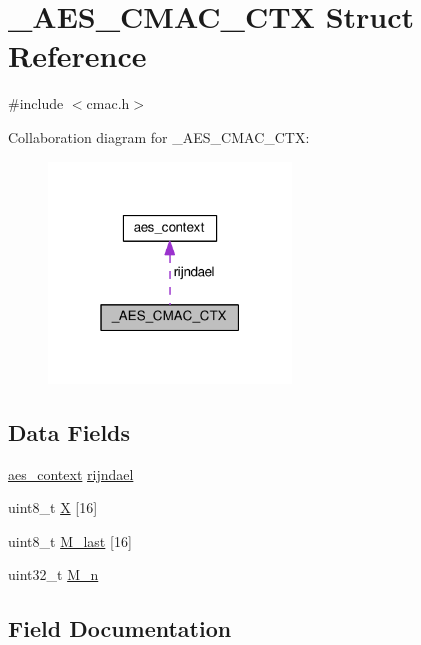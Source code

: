 \hypertarget{struct__AES__CMAC__CTX}{}\section{\+\_\+\+A\+E\+S\+\_\+\+C\+M\+A\+C\+\_\+\+C\+TX Struct Reference}
\label{struct__AES__CMAC__CTX}


{\ttfamily \#include $<$cmac.\+h$>$}



Collaboration diagram for \+\_\+\+A\+E\+S\+\_\+\+C\+M\+A\+C\+\_\+\+C\+TX\+:
\nopagebreak
\begin{figure}[H]
\begin{center}
\leavevmode
\includegraphics[width=183pt]{struct__AES__CMAC__CTX__coll__graph}
\end{center}
\end{figure}
\subsection*{Data Fields}
\begin{DoxyCompactItemize}
\item 
\hyperlink{structaes__context}{aes\+\_\+context} \hyperlink{struct__AES__CMAC__CTX_a111583eab419917697a4ed96963f293c}{rijndael}
\item 
uint8\+\_\+t \hyperlink{struct__AES__CMAC__CTX_a3be115a420dc4da7db29666a2ca6d850}{X} \mbox{[}16\mbox{]}
\item 
uint8\+\_\+t \hyperlink{struct__AES__CMAC__CTX_ac2ab3afeba7a78b17fe98404b15c4ad0}{M\+\_\+last} \mbox{[}16\mbox{]}
\item 
uint32\+\_\+t \hyperlink{struct__AES__CMAC__CTX_a2c48607df1e9c1847d3e4ff11612124b}{M\+\_\+n}
\end{DoxyCompactItemize}


\subsection{Field Documentation}
\mbox{\label{struct__AES__CMAC__CTX_ac2ab3afeba7a78b17fe98404b15c4ad0}} 

